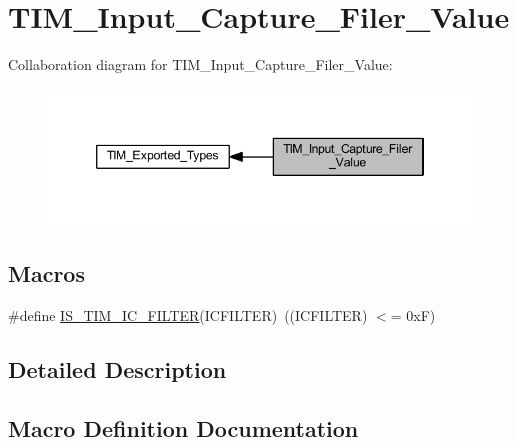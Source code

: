 \hypertarget{group___t_i_m___input___capture___filer___value}{}\section{T\+I\+M\+\_\+\+Input\+\_\+\+Capture\+\_\+\+Filer\+\_\+\+Value}
\label{group___t_i_m___input___capture___filer___value}
Collaboration diagram for T\+I\+M\+\_\+\+Input\+\_\+\+Capture\+\_\+\+Filer\+\_\+\+Value\+:
\nopagebreak
\begin{figure}[H]
\begin{center}
\leavevmode
\includegraphics[width=346pt]{group___t_i_m___input___capture___filer___value}
\end{center}
\end{figure}
\subsection*{Macros}
\begin{DoxyCompactItemize}
\item 
\#define \hyperlink{group___t_i_m___input___capture___filer___value_ga19ecc5fc2e1ce1697c3dbbb9809ca243}{I\+S\+\_\+\+T\+I\+M\+\_\+\+I\+C\+\_\+\+F\+I\+L\+T\+ER}(I\+C\+F\+I\+L\+T\+ER)~((I\+C\+F\+I\+L\+T\+ER) $<$= 0x\+F)
\end{DoxyCompactItemize}


\subsection{Detailed Description}


\subsection{Macro Definition Documentation}
\mbox{\label{group___t_i_m___input___capture___filer___value_ga19ecc5fc2e1ce1697c3dbbb9809ca243}} 
